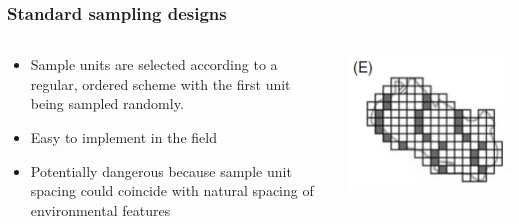 \documentclass[color=usenames,dvipsnames]{beamer}\usepackage[]{graphicx}\usepackage[]{color}
\begin{document}
\begin{frame}
  \frametitle{Standard sampling designs}
  \large
  {\centering \bf \Large \color{RoyalBlue}{Systematic sampling} \par}
  \vfill
  \begin{columns}
    \large
    \begin{column}{0.6\textwidth}
      \begin{itemize}[<+->]
        \item Sample units are selected according to a regular,
          ordered scheme with the first unit being sampled randomly.
        \item Easy to implement in the field
        \item Potentially dangerous because sample unit spacing could
          coincide with natural spacing of environmental features
      \end{itemize}
    \end{column}
    \begin{column}{0.4\textwidth}
      \includegraphics[width=\textwidth]{figs/designE}
    \end{column}
  \end{columns}
\end{frame}






\end{document}
